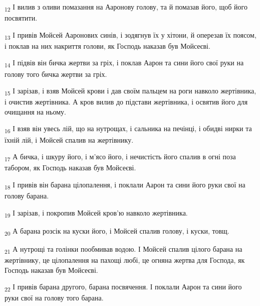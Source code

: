 \begin{tcolorbox}
\textsubscript{12} І вилив з оливи помазання на Ааронову голову, та й помазав його, щоб його посвятити.
\end{tcolorbox}
\begin{tcolorbox}
\textsubscript{13} І привів Мойсей Ааронових синів, і зодягнув їх у хітони, й оперезав їх поясом, і поклав на них накриття голови, як Господь наказав був Мойсеєві.
\end{tcolorbox}
\begin{tcolorbox}
\textsubscript{14} І підвів він бичка жертви за гріх, і поклав Аарон та сини його свої руки на голову того бичка жертви за гріх.
\end{tcolorbox}
\begin{tcolorbox}
\textsubscript{15} І зарізав, і взяв Мойсей крови і дав своїм пальцем на роги навколо жертівника, і очистив жертівника. А кров вилив до підстави жертівника, і освятив його для очищання на ньому.
\end{tcolorbox}
\begin{tcolorbox}
\textsubscript{16} І взяв він увесь лій, що на нутрощах, і сальника на печінці, і обидві нирки та їхній лій, і Мойсей спалив на жертівнику.
\end{tcolorbox}
\begin{tcolorbox}
\textsubscript{17} А бичка, і шкуру його, і м'ясо його, і нечистість його спалив в огні поза табором, як Господь наказав був Мойсеєві.
\end{tcolorbox}
\begin{tcolorbox}
\textsubscript{18} І привів він барана цілопалення, і поклали Аарон та сини його руки свої на голову барана.
\end{tcolorbox}
\begin{tcolorbox}
\textsubscript{19} І зарізав, і покропив Мойсей кров'ю навколо жертівника.
\end{tcolorbox}
\begin{tcolorbox}
\textsubscript{20} А барана розсік на куски його, і Мойсей спалив голову, і куски, товщ.
\end{tcolorbox}
\begin{tcolorbox}
\textsubscript{21} А нутрощі та голінки пообмивав водою. І Мойсей спалив цілого барана на жертівнику, це цілопалення на пахощі любі, це огняна жертва для Господа, як Господь наказав був Мойсеєві.
\end{tcolorbox}
\begin{tcolorbox}
\textsubscript{22} І привів барана другого, барана посвячення. І поклали Аарон та сини його руки свої на голову того барана.
\end{tcolorbox}
